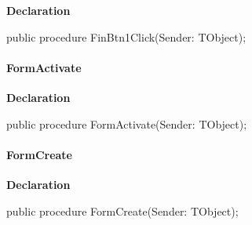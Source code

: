 \documentclass{report}
\newif\ifpdf
\begin{document}
\label{igobase.TIWizFrm-FinBtn1Click}
\begin{list}{}{
\setlength{\itemindent}{0cm}
\setlength{\listparindent}{0cm}
\setlength{\leftmargin}{\evensidemargin}
\addtolength{\leftmargin}{\tmplength}
\settowidth{\labelsep}{X}
\addtolength{\leftmargin}{\labelsep}
\setlength{\labelwidth}{\tmplength}
}
\item[\textbf{Declaration}\hfill]
\ifpdf
\begin{flushleft}
\fi
\begin{ttfamily}
public procedure FinBtn1Click(Sender: TObject);\end{ttfamily}

\ifpdf
\end{flushleft}
\fi

\end{list}
\paragraph*{FormActivate}\hspace*{\fill}

\label{igobase.TIWizFrm-FormActivate}
\begin{list}{}{
\setlength{\itemindent}{0cm}
\setlength{\listparindent}{0cm}
\setlength{\leftmargin}{\evensidemargin}
\addtolength{\leftmargin}{\tmplength}
\settowidth{\labelsep}{X}
\addtolength{\leftmargin}{\labelsep}
\setlength{\labelwidth}{\tmplength}
}
\item[\textbf{Declaration}\hfill]
\ifpdf
\begin{flushleft}
\fi
\begin{ttfamily}
public procedure FormActivate(Sender: TObject);\end{ttfamily}

\ifpdf
\end{flushleft}
\fi

\end{list}
\paragraph*{FormCreate}\hspace*{\fill}

\label{igobase.TIWizFrm-FormCreate}
\begin{list}{}{
\setlength{\itemindent}{0cm}
\setlength{\listparindent}{0cm}
\setlength{\leftmargin}{\evensidemargin}
\addtolength{\leftmargin}{\tmplength}
\settowidth{\labelsep}{X}
\addtolength{\leftmargin}{\labelsep}
\setlength{\labelwidth}{\tmplength}
}
\item[\textbf{Declaration}\hfill]
\ifpdf
\begin{flushleft}
\fi
\begin{ttfamily}
public procedure FormCreate(Sender: TObject);\end{ttfamily}

\ifpdf
\end{flushleft}
\fi

\end{list}
\end{document}
